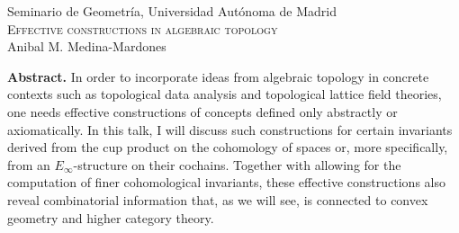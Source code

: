 \documentclass{article}
\begin{document}
	\pagestyle{empty}
	\begin{center}
		\large Seminario de Geometr\'ia, Universidad Aut\'onoma de Madrid \\
		\vspace*{5pt}
		\Large\textsc{Effective constructions in algebraic topology} \\
		\vspace*{10pt}
		\normalsize Anibal M. Medina-Mardones
	\end{center}
	\textbf{Abstract.} In order to incorporate ideas from algebraic topology in concrete contexts such as topological data analysis and topological lattice field theories, one needs effective constructions of concepts defined only abstractly or axiomatically.
	In this talk, I will discuss such constructions for certain invariants derived from the cup product on the cohomology of spaces or, more specifically, from an $E_\infty$-structure on their cochains.
	Together with allowing for the computation of finer cohomological invariants, these effective constructions also reveal combinatorial information that, as we will see, is connected to convex geometry and higher category theory.
\end{document}
